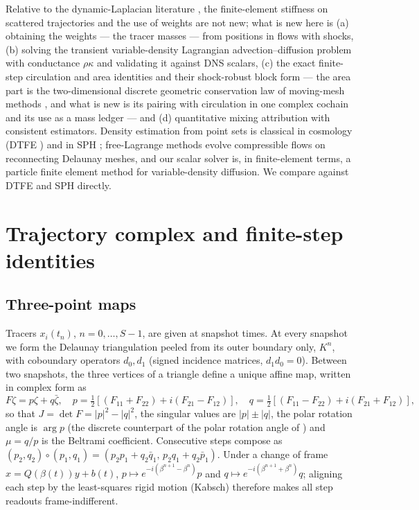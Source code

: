 \documentclass[11pt]{article}
\theoremstyle{definition}\newtheorem{definition}{Definition}\theoremstyle{remark}\newtheorem{remark}{Remark}
\begin{document}
Relative to the dynamic-Laplacian literature \citep{FroylandJunge2018,FroylandKwok2020,KarraschKeller2020}, the finite-element stiffness on scattered trajectories and the use of weights are not new; what is new here is (a) obtaining the weights --- the tracer masses --- from positions in flows with shocks, (b) solving the transient variable-density Lagrangian advection--diffusion problem with conductance $\rho\kappa$ and validating it against DNS scalars, (c) the exact finite-step circulation and area identities and their shock-robust block form --- the area part is the two-dimensional discrete geometric conservation law of moving-mesh methods \citep{ThomasLombard1979,Farhat2001}, and what is new is its pairing with circulation in one complex cochain and its use as a mass ledger --- and (d) quantitative mixing attribution with consistent estimators. Density estimation from point sets is classical in cosmology (DTFE \citep{Schaap2000}) and in SPH \citep{Monaghan2005}; free-Lagrange methods \citep{FreeLagrange1985} evolve compressible flows on reconnecting Delaunay meshes, and our scalar solver is, in finite-element terms, a particle finite element method \citep{Idelsohn2004} for variable-density diffusion. We compare against DTFE and SPH directly.

\section{Trajectory complex and finite-step identities}\label{sec:identities}
\subsection{Three-point maps}
Tracers $x_i(t_n)$, $n=0,\dots,S-1$, are given at snapshot times. At every snapshot we form the Delaunay triangulation peeled from its outer boundary only, $K^n$, with coboundary operators $d_0,d_1$ (signed incidence matrices, $d_1d_0=0$). Between two snapshots, the three vertices of a triangle define a unique affine map, written in complex form as
\begin{equation}
F\zeta=p\zeta+q\bar\zeta,\quad p=\tfrac12[(F_{11}+F_{22})+i(F_{21}-F_{12})],\quad q=\tfrac12[(F_{11}-F_{22})+i(F_{21}+F_{12})],
\end{equation}
so that $J=\det F=|p|^2-|q|^2$, the singular values are $|p|\pm|q|$, the polar rotation angle is $\arg p$ (the discrete counterpart of the polar rotation angle of \citep{FarazmandHaller2016}) and $\mu=q/p$ is the Beltrami coefficient. Consecutive steps compose as $(p_2,q_2)\circ(p_1,q_1)=(p_2p_1+q_2\bar q_1,\,p_2q_1+q_2\bar p_1)$. Under a change of frame $x=Q(\beta(t))y+b(t)$, $p\mapsto e^{-i(\beta^{n+1}-\beta^n)}p$ and $q\mapsto e^{-i(\beta^{n+1}+\beta^n)}q$; aligning each step by the least-squares rigid motion (Kabsch) therefore makes all step readouts frame-indifferent.
\end{document}
